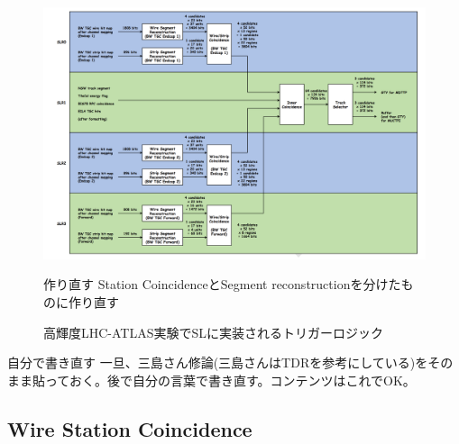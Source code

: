 \begin{figure} 
    \centering
    \includegraphics[width=16cm]{fig/SL/Trigger_overview.png}
    \caption[高輝度LHC-ATLAS実験でSLに実装されるトリガーロジックの全体像]{高輝度LHC-ATLAS実験でSLに実装されるトリガーロジック}
    \begin{itembox}{作り直す}
        Station CoincidenceとSegment reconstructionを分けたものに作り直す
    \end{itembox}
    \label{Trigger_overview}
\end{figure}

\begin{itembox}{自分で書き直す}
    一旦、三島さん修論(三島さんはTDRを参考にしている)をそのまま貼っておく。後で自分の言葉で書き直す。コンテンツはこれでOK。
\end{itembox}

\subsection*{Wire Station Coincidence}

